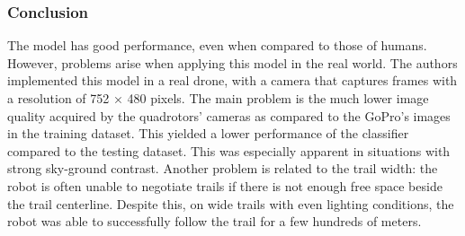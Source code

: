 \subsubsection{Conclusion}\label{header-n191}

The model has good performance, even when compared to those of humans.
However, problems arise when applying this model in the real world. The
authors implemented this model in a real drone, with a camera that
captures frames with a resolution of 752 × 480 pixels. The main problem
is the much lower image quality acquired by the quadrotors' cameras as
compared to the GoPro's images in the training dataset. This yielded a
lower performance of the classifier compared to the testing dataset.
This was especially apparent in situations with strong sky-ground
contrast. Another problem is related to the trail width: the robot is
often unable to negotiate trails if there is not enough free space
beside the trail centerline. Despite this, on wide trails with even
lighting conditions, the robot was able to successfully follow the trail
for a few hundreds of meters.
